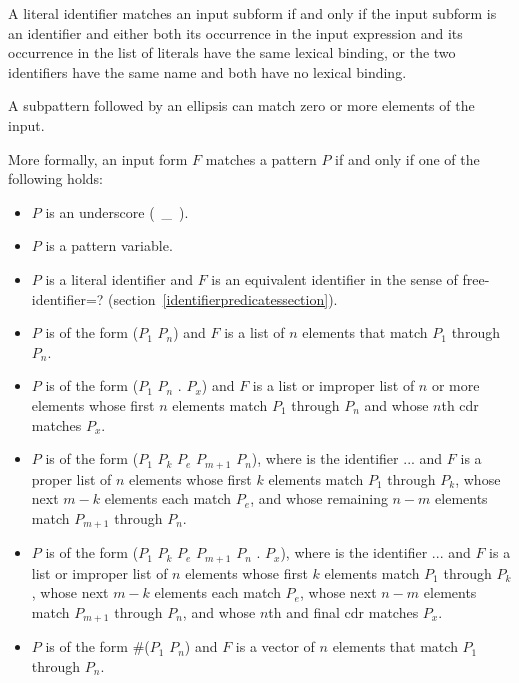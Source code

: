 \begin{entry}
A literal identifier matches an input subform if and only if the input
subform is an identifier and either both its occurrence in the input
expression and its occurrence in the list of literals have the same
lexical binding, or the two identifiers have the same name and both have
no lexical binding.

A subpattern followed by an ellipsis can match zero or more elements of
the input.

More formally, an input form $F$ matches a pattern $P$ if and only if
one of the following holds:

\begin{itemize}
\item $P$ is an underscore (~{\cf \_}~).

\item $P$ is a pattern variable.

\item $P$ is a literal identifier
and $F$ is an equivalent identifier in the
sense of {\cf free-identifier=?}
(section~\ref{identifierpredicatessection}).

\item $P$ is of the form
{\cf ($P_1$ \dotsfoo{} $P_n$)}
and $F$ is a list of $n$ elements that match $P_1$ through
$P_n$.

\item $P$ is of the form
{\cf ($P_1$ \dotsfoo{} $P_n$ . $P_x$)}
and $F$ is a list or improper list of $n$ or more elements
whose first $n$ elements match $P_1$ through $P_n$
and
whose $n$th cdr matches $P_x$.

\item $P$ is of the form
{\cf ($P_1$ \dotsfoo{} $P_k$ $P_e$  $P_{m+1}$ \dotsfoo{} $P_n$)},
where  is the identifier {\cf ...}
and $F$ is a proper list of $n$
elements whose first $k$ elements match $P_1$ through $P_k$,
whose next $m-k$ elements each match $P_e$,
and
whose remaining $n-m$ elements match $P_{m+1}$ through $P_n$.

\item $P$ is of the form
{\cf ($P_1$ \dotsfoo{} $P_k$ $P_e$  $P_{m+1}$ \dotsfoo{} $P_n$ . $P_x$)},
where  is the identifier {\cf ...}
and $F$ is a list or improper list of $n$
elements whose first $k$ elements match $P_1$ through $P_k$,
whose next $m-k$ elements each match $P_e$,
whose next $n-m$ elements match $P_{m+1}$ through $P_n$,
and 
whose $n$th and final cdr matches $P_x$.

\item $P$ is of the form
{\cf \#($P_1$ \dotsfoo{} $P_n$)}
and $F$ is a vector of $n$ elements that match $P_1$ through
$P_n$.


\end{itemize}
\end{entry}
